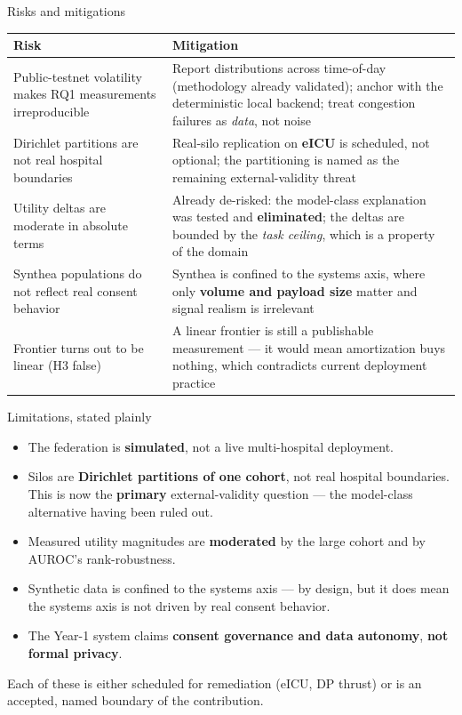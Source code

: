 \documentclass[aspectratio=169, 11pt]{beamer}
\begin{document}
\begin{frame}{Risks and mitigations}
\begin{center}\scriptsize
\begin{tabular}{p{4.3cm}p{7.9cm}}
\toprule
\textbf{Risk} & \textbf{Mitigation}\\
\midrule
Public-testnet volatility makes RQ1 measurements irreproducible &
  Report distributions across time-of-day (methodology already validated);
  anchor with the deterministic local backend; treat congestion failures as
  \emph{data}, not noise\\
\addlinespace
Dirichlet partitions are not real hospital boundaries &
  Real-silo replication on \textbf{eICU} is scheduled, not optional; the
  partitioning is named as the remaining external-validity threat\\
\addlinespace
Utility deltas are moderate in absolute terms &
  Already de-risked: the model-class explanation was tested and
  \textbf{eliminated}; the deltas are bounded by the \emph{task ceiling},
  which is a property of the domain\\
\addlinespace
Synthea populations do not reflect real consent behavior &
  Synthea is confined to the systems axis, where only \textbf{volume and
  payload size} matter and signal realism is irrelevant\\
\addlinespace
Frontier turns out to be linear (H3 false) &
  A linear frontier is still a publishable measurement --- it would mean
  amortization buys nothing, which contradicts current deployment practice\\
\bottomrule
\end{tabular}
\end{center}
\end{frame}

\begin{frame}{Limitations, stated plainly}
\begin{itemize}\setlength\itemsep{0.5em}
\item The federation is \textbf{simulated}, not a live multi-hospital
      deployment.
\item Silos are \textbf{Dirichlet partitions of one cohort}, not real
      hospital boundaries. This is now the \textbf{primary} external-validity
      question --- the model-class alternative having been ruled out.
\item Measured utility magnitudes are \textbf{moderated} by the large cohort
      and by AUROC's rank-robustness.
\item Synthetic data is confined to the systems axis --- by design, but it
      does mean the systems axis is not driven by real consent behavior.
\item The Year-1 system claims \textbf{consent governance and data autonomy},
      \textbf{not formal privacy}.
\end{itemize}
\vspace{0.4em}
{\footnotesize Each of these is either scheduled for remediation (eICU,
DP thrust) or is an accepted, named boundary of the contribution.}
\end{frame}
\end{document}
